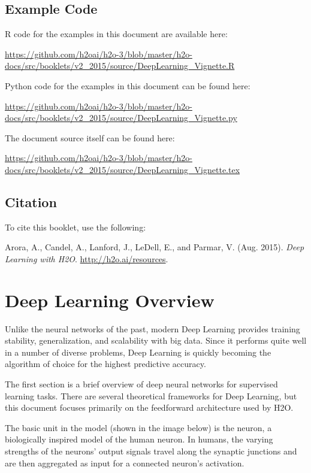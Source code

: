 

\newcommand{\waterVersion}{3.0.1.4}


\subsection{Example Code}

R code for the examples in this document are available here:

\url{https://github.com/h2oai/h2o-3/blob/master/h2o-docs/src/booklets/v2_2015/source/DeepLearning_Vignette.R}

Python code for the examples in this document can be found here:

\url{https://github.com/h2oai/h2o-3/blob/master/h2o-docs/src/booklets/v2_2015/source/DeepLearning_Vignette.py}

The document source itself can be found here:

\url{https://github.com/h2oai/h2o-3/blob/master/h2o-docs/src/booklets/v2_2015/source/DeepLearning_Vignette.tex}

\subsection{Citation}

To cite this booklet, use the following: 

Arora, A., Candel, A., Lanford, J., LeDell, E., and Parmar, V. (Aug. 2015). {\textit{Deep Learning with H2O}}. {\url{http://h2o.ai/resources}}. 

\section{Deep Learning Overview}
Unlike the neural networks of the past, modern Deep Learning  provides training stability, generalization, and scalability with big data. Since it performs quite well in a number of diverse problems, Deep Learning is quickly becoming the algorithm of choice for the highest predictive accuracy. 

The first section is a brief overview of deep neural networks for supervised learning tasks. There are several theoretical frameworks for Deep Learning, but this document focuses primarily on the feedforward architecture used by H2O. 

The basic unit in the model (shown in the image below) is the neuron, a biologically inspired model of the human neuron. In humans, the varying strengths of the neurons' output signals travel along the synaptic junctions and are then aggregated  as input for a connected neuron's activation. 

